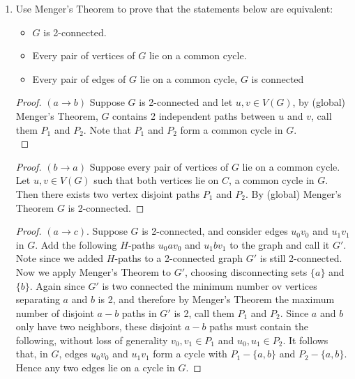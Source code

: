 \documentclass[12pt]{article}
\begin{document}
\begin{enumerate}
\begin{proof}
\end{proof}
\newpage 







\item Use Menger's Theorem to prove that the statements below are equivalent:
\begin{itemize}
	\item $G$ is 2-connected.
	\item Every pair of vertices of $G$ lie on a common cycle.
	\item Every pair of edges of $G$ lie on a common cycle, $G$ is connected
\end{itemize}


\begin{proof}$(a \rightarrow b)$ Suppose $G$ is 2-connected and let $u, v \in V(G)$, by (global) Menger's Theorem, $G$ contains 2 independent paths between $u$ and $v$, call them $P_1$ and $P_2$. Note that $P_1$ and $P_2$ form a common cycle in $G$.\\
\end{proof}


\begin{proof}
$(b \rightarrow a)$ Suppose every pair of vertices of $G$ lie on a common cycle.
	Let $u, v \in V(G)$ such that both vertices lie on $C$, a common cycle in $G$. Then there exists two vertex disjoint paths $P_1$ and $P_2$. By (global) Menger's Theorem $G$ is 2-connected. 
\end{proof}

\begin{proof}$(a \rightarrow c)$. Suppose $G$ is 2-connected, and consider edges $u_0v_0$ and $u_1v_1$ in $G$. Add the following $H$-paths $u_0av_0$ and $u_1bv_1$ to the graph and call it $G'$. Note since we added $H$-paths to a 2-connected graph $G'$ is still 2-connected. Now we apply Menger's Theorem to $G'$, choosing disconnecting sets $\{a\}$ and $\{b\}$. Again since $G'$ is two connected the minimum number ov vertices separating $a$ and $b$ is 2, and therefore by Menger's Theorem the maximum number of disjoint $a-b$ paths in $G'$ is 2, call them $P_1$ and $P_2$. Since $a$ and $b$ only have two neighbors, these disjoint $a-b$ paths must contain the following, without loss of generality $v_0, v_1 \in P_1$ and $u_0, u_1 \in P_2$. It follows that, in $G$, edges $u_0v_0$ and $u_1v_1$ form a cycle with $P_1 - \{a, b\}$ and $P_2 - \{a, b\}$. Hence any two edges lie on a cycle in $G$. 
\end{proof}



\end{enumerate}
\end{document}
